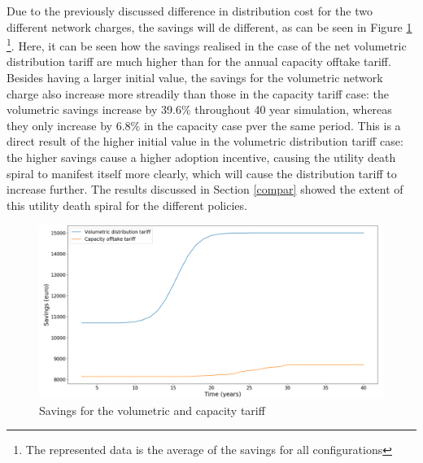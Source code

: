 \noindent
Due to the previously discussed difference in distribution cost for the two different network charges, the savings will de different, as can be seen in Figure \ref{Figure:Savings} \footnote{The represented data is the average of the savings for all configurations}. Here, it can be seen how the savings realised in the case of the net volumetric distribution tariff are much higher than for the annual capacity offtake tariff. Besides having a larger initial value, the savings for the volumetric network charge also increase more streadily than those in the capacity tariff case: the volumetric savings increase by 39.6\% throughout 40 year simulation, whereas they only increase by 6.8\% in the capacity case pver the same period. This is a direct result of the higher initial value in the volumetric distribution tariff case: the higher savings cause a higher adoption incentive, causing the utility death spiral to manifest itself more clearly, which will cause the distribution tariff to increase further. The results discussed in Section \ref{compar} showed the extent of this utility death spiral for the different policies. 
\begin{figure}[h!]
\centering
\includegraphics[width=12cm]{ModelAnalysis/Savings.png}
\caption{Savings for the volumetric and capacity tariff}
\label{Figure:Savings}
\end{figure}
